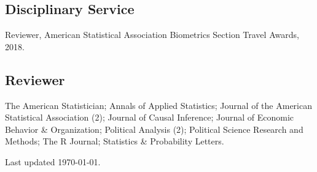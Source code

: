 \documentclass[10pt,letterpaper]{article}
\newenvironment{infolist}{
	\begin{list}{}{
		\setlength{\parskip}{0pt}
		\setlength{\itemsep}{4pt}
		\setlength{\parsep}{0.3em}
		\setlength{\leftmargin}{1.6em}
		\setlength{\labelwidth}{0pt}
		}
	}{
\end{list}
}
\newcommand{\infoitem}[1]{\item {#1}}
\begin{document}
	\subsection*{Disciplinary Service}

	\begin{infolist}
		\infoitem{Reviewer, American Statistical Association Biometrics Section Travel Awards, 2018.}
	\end{infolist}

	\subsection*{Reviewer}

	\begin{infolist}
		\infoitem{The American Statistician; Annals of Applied Statistics; Journal of the American Statistical Association (2); Journal of Causal Inference; Journal of Economic Behavior \& Organization; Political Analysis (2); Political Science Research and Methods; The R Journal; Statistics \& Probability Letters.}
	\end{infolist}

	\bigskip
	{\small Last updated \today.}
\end{document}

